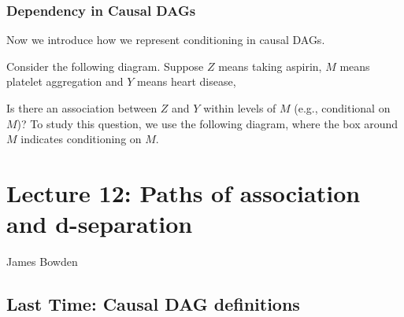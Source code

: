 \subsubsection{Dependency in Causal DAGs}

Now we introduce how we represent conditioning in causal DAGs. 

\begin{example}
    Consider the following diagram. Suppose $Z$ means taking aspirin, $M$ means platelet aggregation and $Y$ means heart disease, 
\begin{center}
\end{center}
Is there an association between $Z$ and $Y$ within levels of $M$ (e.g., conditional on $M$)? To study this question, we use the following diagram, where the box around $M$ indicates conditioning on $M$.

\begin{center}
\end{center}

\end{example}


\section{Lecture 12: Paths of association and d-separation}{James Bowden}

\subsection{Last Time: Causal DAG definitions}

